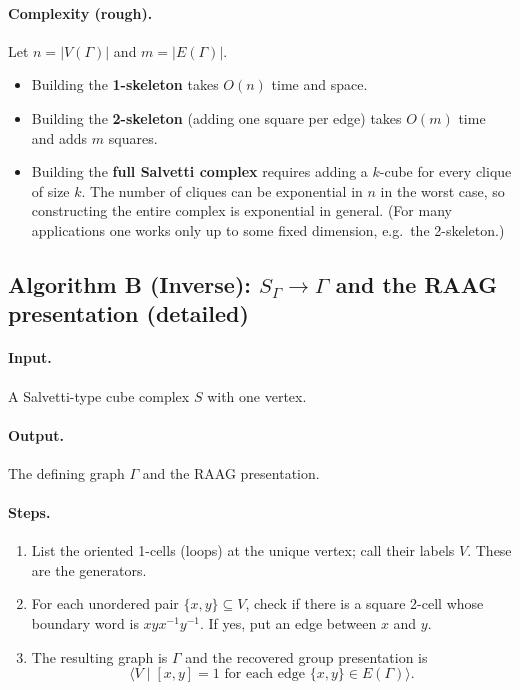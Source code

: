 \documentclass[11pt]{article}
\theoremstyle{definition}
\theoremstyle{plain}
\theoremstyle{remark}
\begin{document}
\begin{enumerate}[leftmargin=2.2em]
\paragraph{Complexity (rough).}\cite{salvetti1987,charney2007,bridsonhaefliger1999,gromov1987}
Let $n=|V(\Gamma)|$ and $m=|E(\Gamma)|$.
\begin{itemize}[leftmargin=2em]
\item Building the \textbf{1-skeleton} takes $O(n)$ time and space.
\item Building the \textbf{2-skeleton} (adding one square per edge) takes $O(m)$ time and adds $m$ squares.
\item Building the \textbf{full Salvetti complex} requires adding a $k$-cube for every clique of size $k$.
The number of cliques can be exponential in $n$ in the worst case, so constructing the entire complex is exponential in general.
(For many applications one works only up to some fixed dimension, e.g.\ the 2-skeleton.)
\end{itemize}
\end{enumerate}

\subsection*{Algorithm B (Inverse): $S_\Gamma\to \Gamma$ and the RAAG presentation (detailed)}\cite{green1990,salvetti1987,charney2007,bridsonhaefliger1999,gromov1987}
\paragraph{Input.} A Salvetti-type cube complex $S$ with one vertex.
\paragraph{Output.} The defining graph $\Gamma$ and the RAAG presentation.

\paragraph{Steps.}
\begin{enumerate}[leftmargin=2.2em]
\item List the oriented 1-cells (loops) at the unique vertex; call their labels $V$.
These are the generators.
\item For each unordered pair $\{x,y\}\subseteq V$, check if there is a square 2-cell whose boundary word is $xyx^{-1}y^{-1}$.
If yes, put an edge between $x$ and $y$.
\item The resulting graph is $\Gamma$ and the recovered group presentation is
\[
\langle V \mid [x,y]=1 \text{ for each edge }\{x,y\}\in E(\Gamma)\rangle.
\]
\end{enumerate}
\end{document}
